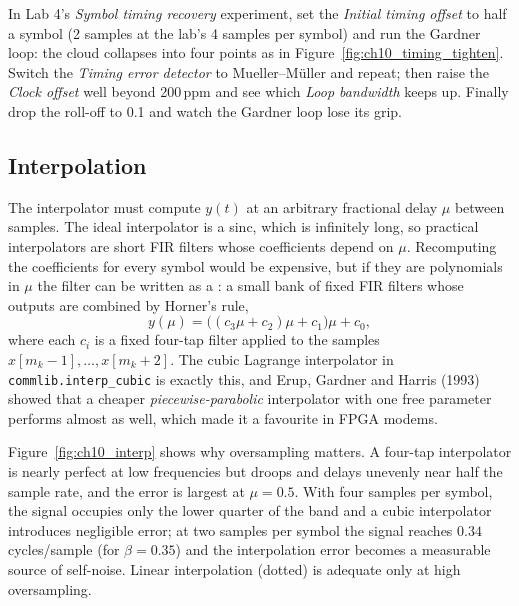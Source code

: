 
\begin{tryit}
In Lab 4's \emph{Symbol timing recovery} experiment, set the \emph{Initial timing offset} to half a
symbol (2 samples at the lab's 4 samples per symbol) and run the Gardner loop: the cloud collapses
into four points as in Figure~\ref{fig:ch10_timing_tighten}. Switch the \emph{Timing error detector}
to Mueller--M\"uller and repeat; then raise the \emph{Clock offset} well beyond 200\,ppm and see
which \emph{Loop bandwidth} keeps up. Finally drop the roll-off to
0.1 and watch the Gardner loop lose its grip.
\end{tryit}

\subsection{Interpolation}

The interpolator must compute $y(t)$ at an arbitrary fractional delay $\mu$ between samples. The ideal
interpolator is a sinc, which is infinitely long, so practical interpolators are short FIR filters
whose coefficients depend on $\mu$. Recomputing the coefficients for every symbol would be expensive,
but if they are polynomials in $\mu$ the filter can be written as a : a small
bank of fixed FIR filters whose outputs are combined by Horner's rule,
\begin{equation}
y(\mu)=\bigl((c_3\mu+c_2)\mu+c_1\bigr)\mu+c_0,
\end{equation}
where each $c_i$ is a fixed four-tap filter applied to the samples $x[m_k-1],\dots,x[m_k+2]$. The cubic
Lagrange interpolator in \texttt{commlib.interp\_cubic} is exactly this, and Erup, Gardner and Harris
(1993) showed that a cheaper \emph{piecewise-parabolic} interpolator with one free parameter performs
almost as well, which made it a favourite in FPGA modems.

Figure~\ref{fig:ch10_interp} shows why oversampling matters. A four-tap interpolator is nearly
perfect at low frequencies but droops and delays unevenly near half the sample rate, and the error is
largest at $\mu=0.5$. With four samples per symbol, the signal occupies only the lower quarter of the
band and a cubic interpolator introduces negligible error; at two samples per symbol the signal
reaches $0.34$ cycles/sample (for $\beta=0.35$) and the interpolation error becomes a measurable
source of self-noise. Linear interpolation (dotted) is adequate only at high oversampling.

